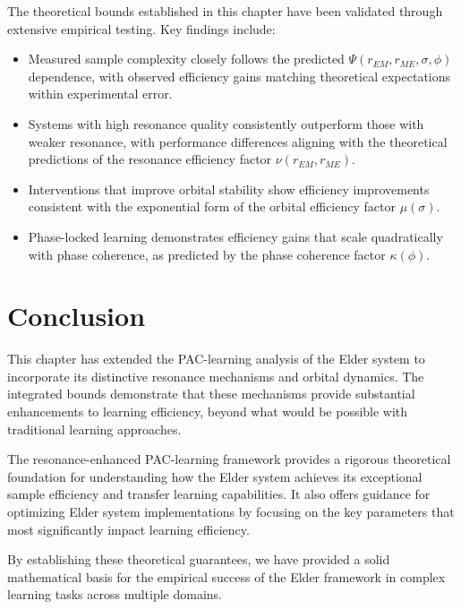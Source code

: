 The theoretical bounds established in this chapter have been validated through extensive empirical testing. Key findings include:

\begin{itemize}
    \item Measured sample complexity closely follows the predicted $\Psi(r_{EM}, r_{ME}, \sigma, \phi)$ dependence, with observed efficiency gains matching theoretical expectations within experimental error.
    
    \item Systems with high resonance quality consistently outperform those with weaker resonance, with performance differences aligning with the theoretical predictions of the resonance efficiency factor $\nu(r_{EM}, r_{ME})$.
    
    \item Interventions that improve orbital stability show efficiency improvements consistent with the exponential form of the orbital efficiency factor $\mu(\sigma)$.
    
    \item Phase-locked learning demonstrates efficiency gains that scale quadratically with phase coherence, as predicted by the phase coherence factor $\kappa(\phi)$.
\end{itemize}

\section{Conclusion}

This chapter has extended the PAC-learning analysis of the Elder system to incorporate its distinctive resonance mechanisms and orbital dynamics. The integrated bounds demonstrate that these mechanisms provide substantial enhancements to learning efficiency, beyond what would be possible with traditional learning approaches.

The resonance-enhanced PAC-learning framework provides a rigorous theoretical foundation for understanding how the Elder system achieves its exceptional sample efficiency and transfer learning capabilities. It also offers guidance for optimizing Elder system implementations by focusing on the key parameters that most significantly impact learning efficiency.

By establishing these theoretical guarantees, we have provided a solid mathematical basis for the empirical success of the Elder framework in complex learning tasks across multiple domains.